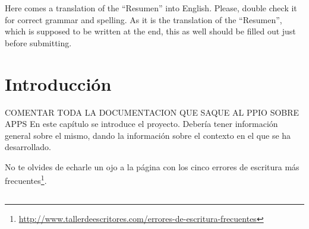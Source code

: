\documentclass[a4paper, 12pt]{book}
\begin{document}
Here comes a translation of the ``Resumen'' into English. Please, double check
it for correct grammar and spelling. As it is the translation of the ``Resumen'',
which is supposed to be written at the end, this as well should be filled out
just before submitting.




\tableofcontents 
\cleardoublepage
\listoffigures %



\cleardoublepage
\chapter{Introducción}
\label{sec:intro} %


COMENTAR TODA LA DOCUMENTACION QUE SAQUE AL PPIO SOBRE APPS
En este capítulo se introduce el proyecto. Debería tener información general sobre 
el mismo, dando la información sobre el contexto en el que se ha desarrollado.

No te olvides de echarle un ojo a la página con los cinco errores de escritura más frecuentes\footnote{\url{http://www.tallerdeescritores.com/errores-de-escritura-frecuentes}}.

\section{}
\label{sec:}
\end{document}
